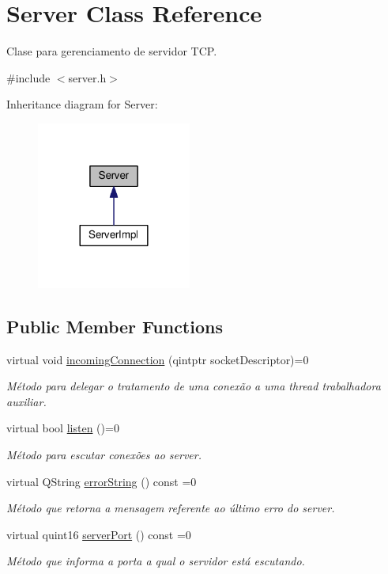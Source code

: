 \hypertarget{classServer}{}\section{Server Class Reference}
\label{classServer}


Clase para gerenciamento de servidor T\+CP.  




{\ttfamily \#include $<$server.\+h$>$}



Inheritance diagram for Server\+:\nopagebreak
\begin{figure}[H]
\begin{center}
\leavevmode
\includegraphics[width=144pt]{d3/dd7/classServer__inherit__graph}
\end{center}
\end{figure}
\subsection*{Public Member Functions}
\begin{DoxyCompactItemize}
\item 
virtual void \hyperlink{classServer_a2397527620515d7e18fc599b22fb64ae}{incoming\+Connection} (qintptr socket\+Descriptor)=0
\begin{DoxyCompactList}\small\item\em Método para delegar o tratamento de uma conexão a uma thread trabalhadora auxiliar. \end{DoxyCompactList}\item 
virtual bool \hyperlink{classServer_a2393cde56bb44076cbfba00c89412acf}{listen} ()=0
\begin{DoxyCompactList}\small\item\em Método para escutar conexões ao server. \end{DoxyCompactList}\item 
virtual Q\+String \hyperlink{classServer_a66eb77ac2362bdae05081591389c3cf5}{error\+String} () const =0
\begin{DoxyCompactList}\small\item\em Método que retorna a mensagem referente ao último erro do server. \end{DoxyCompactList}\item 
virtual quint16 \hyperlink{classServer_ad32766e2608017d9fcd0903ab3748803}{server\+Port} () const =0
\begin{DoxyCompactList}\small\item\em Método que informa a porta a qual o servidor está escutando. \end{DoxyCompactList}\end{DoxyCompactItemize}


